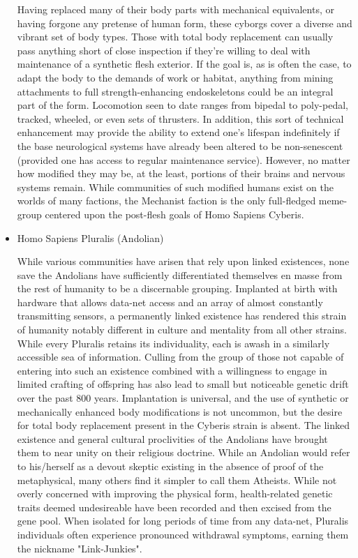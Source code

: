 \begin{itemize}
Having replaced many of their body parts with mechanical equivalents,
or having forgone any pretense of human form, these cyborgs cover a
diverse and vibrant set of body types. Those with total body
replacement can usually pass anything short of close inspection if
they're willing to deal with maintenance of a synthetic flesh
exterior. If the goal is, as is often the case, to adapt the body to
the demands of work or habitat, anything from mining attachments to
full strength-enhancing endoskeletons could be an integral part of the
form. Locomotion seen to date ranges from bipedal to poly-pedal,
tracked, wheeled, or even sets of thrusters. In addition, this sort of
technical enhancement may provide the ability to extend one's lifespan
indefinitely if the base neurological systems have already been
altered to be non-senescent (provided one has access to regular
maintenance service). However, no matter how modified they may be, at
the least, portions of their brains and nervous systems remain.  While
communities of such modified humans exist on the worlds of many
factions, the Mechanist faction is the only full-fledged meme-group
centered upon the post-flesh goals of Homo Sapiens Cyberis.

\item Homo Sapiens Pluralis (Andolian)

While various communities have arisen that rely upon linked
existences, none save the Andolians have sufficiently differentiated
themselves en masse from the rest of humanity to be a discernable
grouping. Implanted at birth with hardware that allows data-net access
and an array of almost constantly transmitting sensors, a permanently
linked existence has rendered this strain of humanity notably
different in culture and mentality from all other strains.  While
every Pluralis retains its individuality, each is awash in a similarly
accessible sea of information. Culling from the group of those not
capable of entering into such an existence combined with a willingness
to engage in limited crafting of offspring has also lead to small but
noticeable genetic drift over the past 800 years. Implantation is
universal, and the use of synthetic or mechanically enhanced body
modifications is not uncommon, but the desire for total body
replacement present in the Cyberis strain is absent.  The linked
existence and general cultural proclivities of the Andolians have
brought them to near unity on their religious doctrine. While an
Andolian would refer to his/herself as a devout skeptic existing in
the absence of proof of the metaphysical, many others find it simpler
to call them Atheists.  While not overly concerned with improving the
physical form, health-related genetic traits deemed undesireable have
been recorded and then excised from the gene pool. When isolated for
long periods of time from any data-net, Pluralis individuals often
experience pronounced withdrawal symptoms, earning them the nickname
"Link-Junkies".


\end{itemize}
